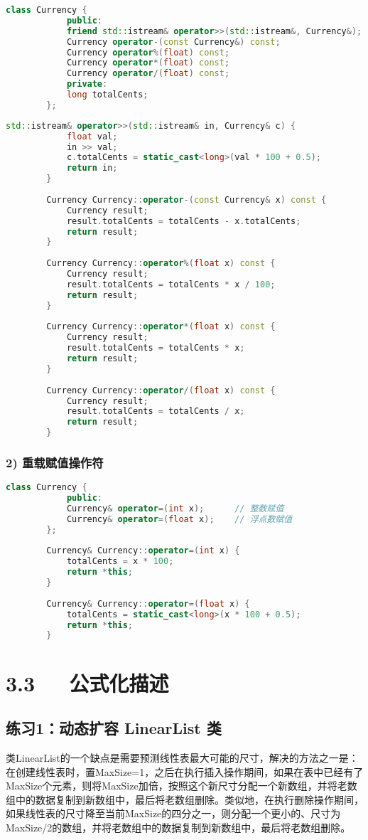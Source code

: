 \documentclass[UTF8]{ctexart}
\begin{document}
	\begin{lstlisting}[language=C++]
		class Currency {
			public:
			friend std::istream& operator>>(std::istream&, Currency&);
			Currency operator-(const Currency&) const;
			Currency operator%(float) const;
			Currency operator*(float) const;
			Currency operator/(float) const;
			private:
			long totalCents;
		};
	\end{lstlisting}
	
	\begin{lstlisting}[language=C++]
		std::istream& operator>>(std::istream& in, Currency& c) {
			float val;
			in >> val;
			c.totalCents = static_cast<long>(val * 100 + 0.5);
			return in;
		}
		
		Currency Currency::operator-(const Currency& x) const {
			Currency result;
			result.totalCents = totalCents - x.totalCents;
			return result;
		}
		
		Currency Currency::operator%(float x) const {
			Currency result;
			result.totalCents = totalCents * x / 100;
			return result;
		}
		
		Currency Currency::operator*(float x) const {
			Currency result;
			result.totalCents = totalCents * x;
			return result;
		}
		
		Currency Currency::operator/(float x) const {
			Currency result;
			result.totalCents = totalCents / x;
			return result;
		}
	\end{lstlisting}
	
	\subsubsection{2) 重载赋值操作符}
	
	\begin{lstlisting}[language=C++]
		class Currency {
			public:
			Currency& operator=(int x);      // 整数赋值
			Currency& operator=(float x);    // 浮点数赋值
		};
		
		Currency& Currency::operator=(int x) {
			totalCents = x * 100;
			return *this;
		}
		
		Currency& Currency::operator=(float x) {
			totalCents = static_cast<long>(x * 100 + 0.5);
			return *this;
		}
	\end{lstlisting}
	\section{3.3~~~公式化描述}
	\subsection{练习1：动态扩容 LinearList 类}
	类LinearList的一个缺点是需要预测线性表最大可能的尺寸，解决的方法之一是：在创建线性表时，置MaxSize=1，之后在执行插入操作期间，如果在表中已经有了MaxSize个元素，则将MaxSize加倍，按照这个新尺寸分配一个新数组，并将老数组中的数据复制到新数组中，最后将老数组删除。类似地，在执行删除操作期间，如果线性表的尺寸降至当前MaxSize的四分之一，则分配一个更小的、尺寸为MaxSize/2的数组，并将老数组中的数据复制到新数组中，最后将老数组删除。
	
\end{document}
